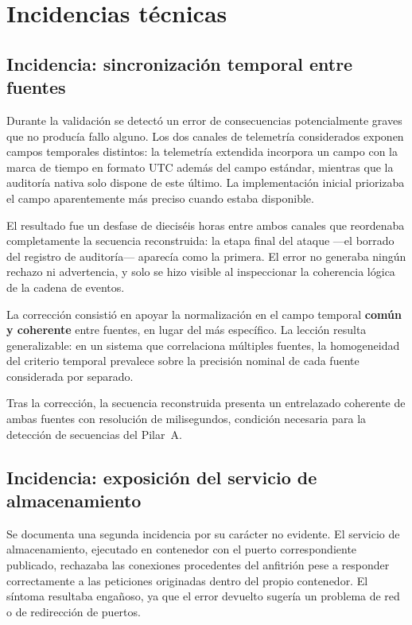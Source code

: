 \section{Incidencias técnicas}
\label{anx:incidencias}

\subsection{Incidencia: sincronización temporal entre fuentes}
\label{sec:incidencia_temporal}

Durante la validación se detectó un error de consecuencias potencialmente graves que no
producía fallo alguno. Los dos canales de telemetría considerados exponen campos temporales
distintos: la telemetría extendida incorpora un campo con la marca de tiempo en formato UTC
además del campo estándar, mientras que la auditoría nativa solo dispone de este último. La
implementación inicial priorizaba el campo aparentemente más preciso cuando estaba
disponible.

El resultado fue un desfase de dieciséis horas entre ambos canales que reordenaba
completamente la secuencia reconstruida: la etapa final del ataque —el borrado del registro de
auditoría— aparecía como la primera. El error no generaba ningún rechazo ni advertencia, y
solo se hizo visible al inspeccionar la coherencia lógica de la cadena de eventos.

La corrección consistió en apoyar la normalización en el campo temporal \textbf{común y
coherente} entre fuentes, en lugar del más específico. La lección resulta generalizable: en un
sistema que correlaciona múltiples fuentes, la homogeneidad del criterio temporal prevalece
sobre la precisión nominal de cada fuente considerada por separado.

Tras la corrección, la secuencia reconstruida presenta un entrelazado coherente de ambas
fuentes con resolución de milisegundos, condición necesaria para la detección de secuencias
del Pilar~A.


\subsection{Incidencia: exposición del servicio de almacenamiento}

Se documenta una segunda incidencia por su carácter no evidente. El servicio de
almacenamiento, ejecutado en contenedor con el puerto correspondiente publicado, rechazaba
las conexiones procedentes del anfitrión pese a responder correctamente a las peticiones
originadas dentro del propio contenedor. El síntoma resultaba engañoso, ya que el error
devuelto sugería un problema de red o de redirección de puertos.


